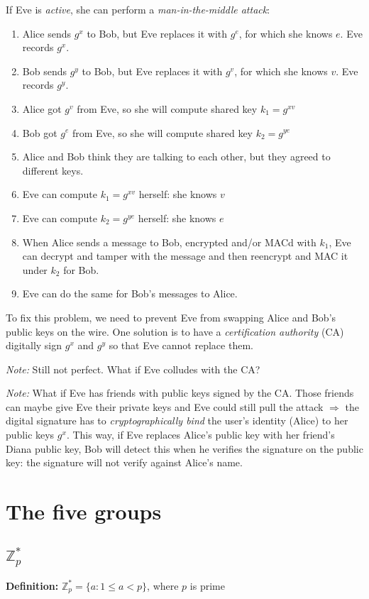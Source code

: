\documentclass[11pt]{article}
\newcommand{\Zp}{\mathbb{Z}^{\ast}_p}
\newcommand{\definition}{\textbf{Definition:} }
\newcommand{\note}{\emph{Note:} }
\begin{document}
If Eve is \emph{active}, she can perform a \emph{man-in-the-middle attack}:

\begin{enumerate}
  \item Alice sends $g^x$ to Bob, but Eve replaces it with $g^e$, for which she
  knows $e$. Eve records $g^x$.
  \item Bob sends $g^y$ to Bob, but Eve replaces it with $g^v$, for which she
  knows $v$. Eve records $g^y$.
  \item Alice got $g^v$ from Eve, so she will compute shared key $k_1 = g^{xv}$
  \item Bob got $g^e$ from Eve, so she will compute shared key $k_2 = g^{ye}$
  \item Alice and Bob think they are talking to each other, but they agreed to
  different keys.
  \item Eve can compute $k_1 = g^{xv}$ herself: she knows $v$
  \item Eve can compute $k_2 = g^{ye}$ herself: she knows $e$
  \item When Alice sends a message to Bob, encrypted and/or MACd with $k_1$, Eve
  can decrypt and tamper with the message and then reencrypt and MAC it under $k_2$
  for Bob.
  \item Eve can do the same for Bob's messages to Alice.
\end{enumerate}

To fix this problem, we need to prevent Eve from swapping Alice and Bob's public
keys on the wire. One solution is to have a \emph{certification authority} (CA)
digitally sign $g^x$ and $g^y$ so that Eve cannot replace them.

\note Still not perfect. What if Eve colludes with the CA?

\note What if Eve has friends with public keys signed by the CA. Those friends can maybe give Eve their private keys and Eve could still pull the attack $\Rightarrow$ the
digital signature has to \emph{cryptographically bind} the user's identity (Alice)
to her public keys $g^x$. This way, if Eve replaces Alice's public key with
her friend's Diana public key, Bob will detect this when he verifies the signature
on the public key: the signature will not verify against Alice's name.

\section{The five groups}

\subsection{$\Zp$}
\definition $\Zp = \{ a : 1 \le a < p\}$, where $p$ is prime
\end{document}
